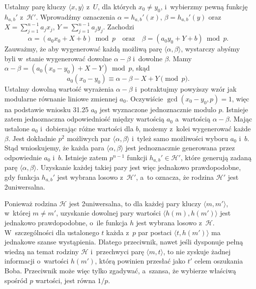 \subproblem %
Ustalmy parę kluczy $\langle x,y\rangle$ z~$U$, dla których $x_0\ne y_0$, i~wybierzmy pewną funkcję $h_{a,b}'$ z~$\mathcal{H}'$.
Wprowadźmy oznaczenia $\alpha=h_{a,b}'(x)$, $\beta=h_{a,b}'(y)$ oraz $X=\sum_{j=1}^{n-1}a_jx_j$, $Y=\sum_{j=1}^{n-1}a_jy_j$.
Zachodzi
\[
	\alpha = (a_0x_0+X+b)\bmod p \quad\text{oraz}\quad \beta = (a_0y_0+Y+b)\bmod p.
\]
Zauważmy, że aby wygenerować każdą możliwą parę $\langle\alpha,\beta\rangle$, wystarczy abyśmy byli w~stanie wygenerować dowolne $\alpha-\beta$ i~dowolne $\beta$.
Mamy $\alpha-\beta=(a_0(x_0-y_0)+X-Y)\bmod p$, skąd
\[
	a_0(x_0-y_0) \equiv \alpha-\beta-X+Y \pmod p.
\]
Ustalmy dowolną wartość wyrażenia $\alpha-\beta$ i~potraktujmy powyższy wzór jak modularne równanie liniowe zmiennej $a_0$.
Oczywiście $\gcd(x_0-y_0,p)=1$, więc na podstawie wniosku 31.25 $a_0$ jest wyznaczone jednoznacznie modulo $p$.
Istnieje zatem jednoznaczna odpowiedniość między wartością $a_0$ a~wartością $\alpha-\beta$.
Mając ustalone $a_0$ i~dobierając różne wartości dla $b$, możemy z~kolei wygenerować każde $\beta$.
Jest dokładnie $p^2$ możliwych par $\langle\alpha,\beta\rangle$ i~tyleż samo możliwości wyboru $a_0$ i~$b$.
Stąd wnioskujemy, że każda para $\langle\alpha,\beta\rangle$ jest jednoznacznie generowana przez odpowiednie $a_0$ i~$b$.
Istnieje zatem $p^{n-1}$ funkcji $h_{a,b}'\in\mathcal{H}'$, które generują zadaną parę $\langle\alpha,\beta\rangle$.
Uzyskanie każdej takiej pary jest więc jednakowo prawdopodobne, gdy funkcja $h_{a,b}'$ jest wybrana losowo z~$\mathcal{H}'$, a~to oznacza, że rodzina $\mathcal{H}'$ jest 2\nbhyphen uniwersalna.

\subproblem %
Ponieważ rodzina $\mathcal{H}$ jest 2\nbhyphen uniwersalna, to dla każdej pary kluczy $\langle m,m'\rangle$, w~której $m\ne m'$, uzyskanie dowolnej pary wartości $\langle h(m),h(m')\rangle$ jest jednakowo prawdopodobne, o~ile funkcja $h$ jest wybrana losowo z~$\mathcal{H}$.
W~szczególności dla ustalonego $t$ każda z~$p$ par postaci $\langle t,h(m')\rangle$ ma jednakowe szanse wystąpienia.
Dlatego przeciwnik, nawet jeśli dysponuje pełną wiedzą na temat rodziny $\mathcal{H}$ i~przechwyci parę $\langle m,t\rangle$, to nie zyskuje żadnej informacji o~wartości $h(m')$, którą powinien przesłać jako $t'$ celem oszukania Boba.
Przeciwnik może więc tylko zgadywać, a~szansa, że wybierze właściwą spośród $p$ wartości, jest równa $1/p$.
